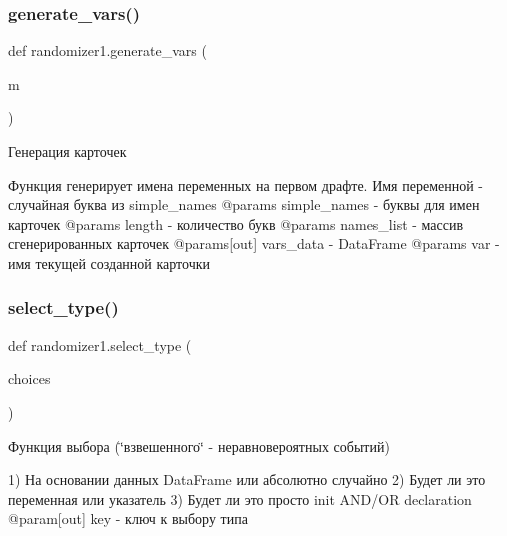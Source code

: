 \subsubsection{\texorpdfstring{generate\_vars()}{generate\_vars()}}
{\footnotesize\ttfamily def randomizer1.\+generate\+\_\+vars (\begin{DoxyParamCaption}\item[{}]{m }\end{DoxyParamCaption})}



Генерация карточек 

Функция генерирует имена переменных на первом драфте. Имя переменной -\/ случайная буква из simple\+\_\+names @params simple\+\_\+names -\/ буквы для имен карточек @params length -\/ количество букв @params names\+\_\+list -\/ массив сгенерированных карточек @params\mbox{[}out\mbox{]} vars\+\_\+data -\/ Data\+Frame @params var -\/ имя текущей созданной карточки \mbox{\label{namespacerandomizer1_a82d6d6bde9c9bf9b4624bda3d736dc5a}} 
\subsubsection{\texorpdfstring{select\_type()}{select\_type()}}
{\footnotesize\ttfamily def randomizer1.\+select\+\_\+type (\begin{DoxyParamCaption}\item[{}]{choices }\end{DoxyParamCaption})}



Функция выбора (\char`\"{}взвешенного\char`\"{} -\/ неравновероятных событий) 

\begin{DoxyVerb}1) На основании данных DataFrame или абсолютно случайно
2) Будет ли это переменная или указатель
3) Будет ли это просто init AND/OR declaration
@param[out] key - ключ к выбору типа
\end{DoxyVerb}
 